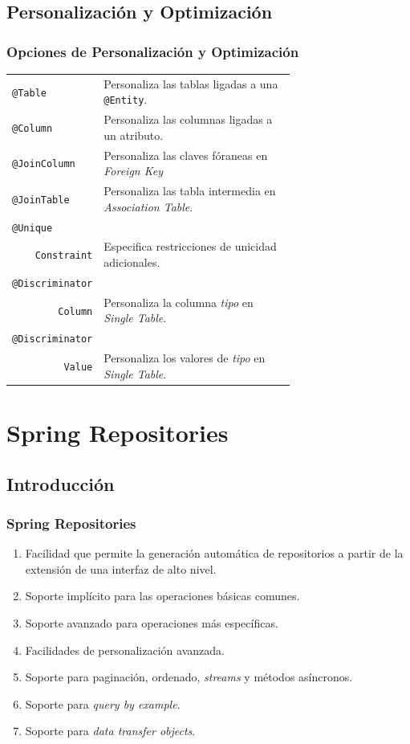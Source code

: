 \documentclass[handout,a4paper,slidestop,xcolor=pst,blue]{beamer}
\newcommand{\ann}[1]{\color{blue}\texttt{#1}\color{black}}
\begin{document}
\subsection{Personalización y Optimización}

\begin{frame}[c]
    \frametitle{Opciones de Personalización y Optimización}
    \begin{tabular}{lp{0.70\linewidth}}
        \ann{@Table}      & Personaliza las tablas ligadas a una \ann{@Entity}. \\
        \ann{@Column}     & Personaliza las columnas ligadas a un atributo. \\
        \ann{@JoinColumn} & Personaliza las claves fóraneas en \emph{Foreign Key} \\
        \ann{@JoinTable } & Personaliza las tabla intermedia en \emph{Association Table}. \\
        \ann{@Unique}     & \\
        \multicolumn{1}{r}{\ann{Constraint}} & Especifica restricciones de unicidad adicionales. \\
        \ann{@Discriminator} &  \\
        \multicolumn{1}{r}{\ann{Column}} & Personaliza la columna \emph{tipo} en \emph{Single Table}. \\
        \ann{@Discriminator} &  \\
        \multicolumn{1}{r}{\ann{Value}} & Personaliza los valores de \emph{tipo} en \emph{Single Table}. \\
    \end{tabular}
\end{frame}

\section{Spring Repositories}

\subsection{Introducción}

\begin{frame}[c]
    \frametitle{Spring Repositories}
    \begin{enumerate}[<+->]
        \item Facilidad que permite la generación automática de repositorios a partir de la extensión de una interfaz de alto nivel.
        \item Soporte implícito para las operaciones básicas comunes.
        \item Soporte avanzado para operaciones más específicas.
        \item Facilidades de personalización avanzada.
        \item Soporte para paginación, ordenado, \emph{streams} y métodos asíncronos.
        \item Soporte para \emph{query by example}.
        \item Soporte para \emph{data transfer objects}.
    \end{enumerate}
\end{frame}
\end{document}
